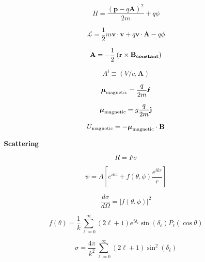 \documentclass[11pt]{article}
\newcommand{\Lagr}{\mathcal{L}}
\newcommand{\vect}[1]{\boldsymbol{\mathbf{#1}}}
\begin{document}
\begin{multicols}{2}
\begin{equation}
H = \frac{(\vect{p} - q \vect{A})^2}{2m} + q \phi
\end{equation}

\begin{equation}
\Lagr = \frac{1}{2} m \vect{v} \cdot \vect{v} + q \vect{v} \cdot \vect{A} - q \phi
\end{equation}

\begin{equation}
\vect{A} = - \frac{1}{2} \: (\vect{r} \times \vect{B_{\rm constant}})
\end{equation}

\begin{equation}
A^{i} \equiv (V/c,\vect{A})
\end{equation}

\begin{equation}
\vect{\mu}_{\rm magnetic} = \frac{q}{2m} \vect{\ell}
\end{equation}

\begin{equation}
\vect{\mu}_{\rm magnetic} = g \frac{q}{2m} \vect{j}
\end{equation}

\begin{equation}
U_{\rm magnetic} = - \vect{\mu}_{\rm magnetic} \cdot \vect{B}
\end{equation}

{\bf Scattering}

\begin{equation}
R = F \sigma
\end{equation}

\begin{equation}
\psi = A \left [
         e^{ikz} + f(\theta,\phi) \frac{e^{ikr}}{r}
         \right ]
\end{equation}

\begin{equation}
\frac{d \sigma}{d \Omega} = |f(\theta,\phi)|^2
\end{equation}

\begin{equation}
f(\theta) = \frac{1}{k} \sum_{\ell=0}^{\infty}
            (2\ell+1) e^{i\delta_{\ell}} \sin(\delta_{\ell})
            P_{\ell}(\cos \theta)
\end{equation}

\begin{equation}
\sigma = \frac{4\pi}{k^2} \sum_{\ell = 0}^{\infty} (2\ell+1)
         \sin ^2(\delta_{\ell})
\end{equation}


\end{multicols}
\end{document}
